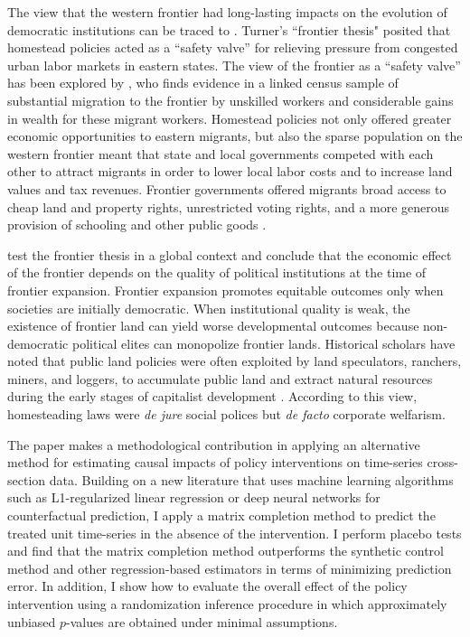 \documentclass[hidelinks,12pt]{article}
\begin{document}
The view that the western frontier had long-lasting impacts on the evolution of democratic institutions can be traced to \citet{turner1956significance}. Turner's ``frontier thesis" posited that homestead policies acted as a ``safety valve'' for relieving pressure from congested urban labor markets in eastern states. The view of the frontier as a ``safety valve'' has been explored by \citet{ferrie1997migration}, who finds evidence in a linked census sample of substantial migration to the frontier by unskilled workers and considerable gains in wealth for these migrant workers. Homestead policies not only offered greater economic opportunities to eastern migrants, but also the sparse population on the western frontier meant that state and local governments competed with each other to attract migrants in order to lower local labor costs and to increase land values and tax revenues. Frontier governments offered migrants broad access to cheap land and property rights, unrestricted voting rights, and a more generous provision of schooling and other public goods \citep{engerman2005evolution}.

\citet{garcia2008myth} test the frontier thesis in a global context and conclude that the economic effect of the frontier depends on the quality of political institutions at the time of frontier expansion. Frontier expansion promotes equitable outcomes only when societies are initially democratic. When institutional quality is weak, the existence of frontier land can yield worse developmental outcomes because non-democratic political elites can monopolize frontier lands. Historical scholars have noted that public land policies were often exploited by land speculators, ranchers, miners, and loggers, to accumulate public land and extract natural resources during the early stages of capitalist development \citep{gates1942role,murtazashvili2013political}. According to this view, homesteading laws were \emph{de jure} social polices but \emph{de facto} corporate welfarism. 

The paper makes a methodological contribution in applying an alternative method for estimating causal impacts of policy interventions on time-series cross-section data. Building on a new literature that uses machine learning algorithms such as L1-regularized linear regression \citep{doudchenko2016balancing} or deep neural networks \citep{poulos2017rnn} for counterfactual prediction, I apply a matrix completion method to predict the treated unit time-series in the absence of the intervention. I perform placebo tests and find that the matrix completion method outperforms the synthetic control method and other regression-based estimators in terms of minimizing prediction error. In addition, I show how to evaluate the overall effect of the policy intervention using a randomization inference procedure in which approximately unbiased $p$-values are obtained under minimal assumptions.
\end{document}
